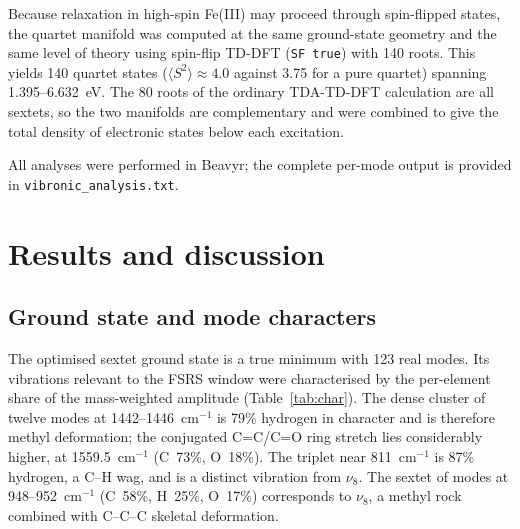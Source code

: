\documentclass[11pt,a4paper]{article}
\newcommand{\wn}{\ensuremath{\mathrm{cm^{-1}}}}
\begin{document}
Because relaxation in high-spin Fe(III) may proceed through spin-flipped
states, the quartet manifold was computed at the same ground-state geometry
and the same level of theory using spin-flip TD-DFT (\texttt{SF true}) with
140 roots. This yields 140 quartet states ($\langle S^{2}\rangle \approx 4.0$
against 3.75 for a pure quartet) spanning 1.395--6.632~eV. The 80 roots of the
ordinary TDA-TD-DFT calculation are all sextets, so the two manifolds are
complementary and were combined to give the total density of electronic states
below each excitation.

All analyses were performed in Beavyr; the complete per-mode output is
provided in \texttt{vibronic\_analysis.txt}.

\section{Results and discussion}

\subsection{Ground state and mode characters}

The optimised sextet ground state is a true minimum with 123 real modes. Its
vibrations relevant to the FSRS window were characterised by the per-element
share of the mass-weighted amplitude (Table~\ref{tab:char}). The dense cluster
of twelve modes at 1442--1446~\wn{} is 79\% hydrogen in character and is
therefore methyl deformation; the conjugated C=C/C=O ring stretch lies considerably higher, at
1559.5~\wn{} (C~73\%, O~18\%). The triplet near 811~\wn{} is 87\% hydrogen,
a C--H wag, and is a distinct vibration from $\nu_8$. The sextet of modes at
948--952~\wn{} (C~58\%, H~25\%, O~17\%) corresponds to $\nu_8$, a methyl
rock combined with C--C--C skeletal deformation.
\end{document}
